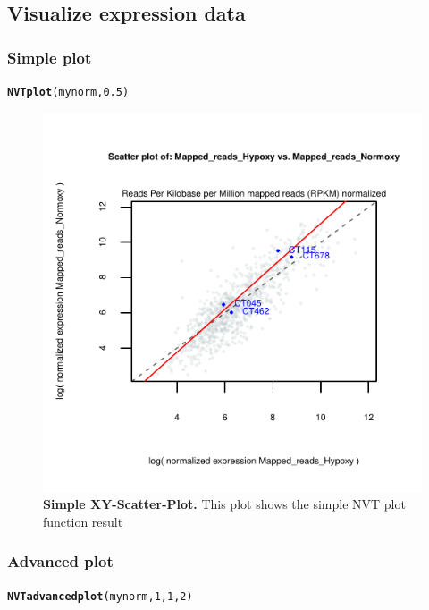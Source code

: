 \documentclass[11pt]{article}\usepackage[]{graphicx}\usepackage[]{color}
\makeatletter
\newcommand{\hlnum}[1]{\textcolor[rgb]{0.686,0.059,0.569}{#1}}%
\newcommand{\hlstd}[1]{\textcolor[rgb]{0.345,0.345,0.345}{#1}}%
\newcommand{\hlkwd}[1]{\textcolor[rgb]{0.737,0.353,0.396}{\textbf{#1}}}%
\newenvironment{kframe}{%
 \def\at@end@of@kframe{}%
 \ifinner\ifhmode%
  \def\at@end@of@kframe{\end{minipage}}%
  \begin{minipage}{\columnwidth}%
 \fi\fi%
 \def\FrameCommand##1{\hskip\@totalleftmargin \hskip-\fboxsep
 \colorbox{shadecolor}{##1}\hskip-\fboxsep
     \hskip-\linewidth \hskip-\@totalleftmargin \hskip\columnwidth}%
 \MakeFramed {\advance\hsize-\width
   \@totalleftmargin\z@ \linewidth\hsize
   \@setminipage}}%
 {\par\unskip\endMakeFramed%
 \at@end@of@kframe}
\newenvironment{knitrout}{}{} %
\makeatother
\begin{document}
\subsection{Visualize expression data}

\subsubsection{Simple plot}

\begin{knitrout}
\color{fgcolor}\begin{kframe}
\begin{alltt}
\hlkwd{NVTplot}\hlstd{(mynorm,}\hlnum{0.5}\hlstd{)}
\end{alltt}
\end{kframe}
\end{knitrout}

\begin{figure}
\centering
\includegraphics[width=.8\textwidth]{figure/simpleplot-1}
\caption{
  \textbf{Simple XY-Scatter-Plot.}
  This plot shows the simple NVT plot function result}
\label{fig:MA}
\end{figure}

\newpage

\subsubsection{Advanced plot}

\begin{knitrout}
\color{fgcolor}\begin{kframe}
\begin{alltt}
\hlkwd{NVTadvancedplot}\hlstd{(mynorm,}\hlnum{1}\hlstd{,}\hlnum{1}\hlstd{,}\hlnum{2}\hlstd{)}
\end{alltt}
\end{kframe}
\end{knitrout}
\end{document}
